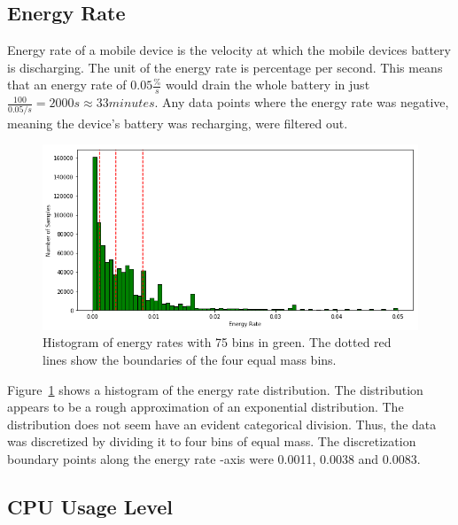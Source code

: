 \subsection{Energy Rate}

Energy rate of a mobile device is the velocity at which the mobile devices battery is discharging. The unit of the energy rate is percentage per second. This means that an energy rate of $0.05\frac{\%}{s}$ would drain the whole battery in just $\frac{100}{0.05 / s} = 2000 s \approx 33 minutes$. Any data points where the energy rate was negative, meaning the device's battery was recharging, were filtered out.

\begin{figure} %
	\centering
	\includegraphics[width=\textwidth]{images/carat-data/energy_rate_w_boundaries.png}
	\caption{Histogram of energy rates with 75 bins in green. The dotted red lines show the boundaries of the four equal mass bins.}
	\label{figure:carat-data-energy-rate}
\end{figure}  


Figure~\ref{figure:carat-data-energy-rate} shows a histogram of the energy rate distribution. The distribution appears to be a rough approximation of an exponential distribution. The distribution does not seem have an evident categorical division. Thus, the data was discretized by dividing it to four bins of equal mass. The discretization boundary points along the energy rate -axis were 0.0011, 0.0038 and 0.0083.

\subsection{CPU Usage Level} \label{carat data cpu} 

